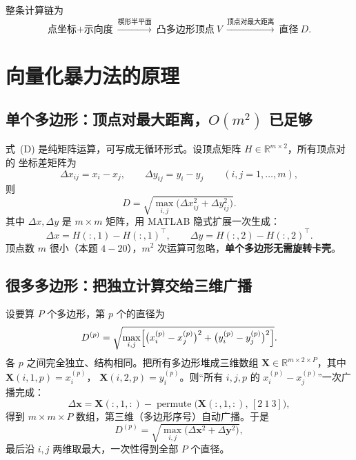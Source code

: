 \documentclass[11pt,a4paper]{ctexart}
\begin{document}
整条计算链为
\begin{equation}
\text{点坐标+示向度}\ \xrightarrow{\text{楔形半平面}}\ \text{凸多边形顶点}\ V\ \xrightarrow{\text{顶点对最大距离}}\ \text{直径}\ D .
\end{equation}

\section{向量化暴力法的原理}

\subsection{单个多边形：顶点对最大距离，$O(m^2)$ 已足够}

式~(D) 是纯矩阵运算，可写成无循环形式。设顶点矩阵 $H\in\mathbb R^{m\times2}$，所有顶点对的
坐标差矩阵为
\begin{equation}
\Delta x_{ij}=x_i-x_j,\qquad \Delta y_{ij}=y_i-y_j\qquad (i,j=1,\dots,m),
\end{equation}
则
\begin{equation}
D=\sqrt{\max_{i,j}\bigl(\Delta x_{ij}^2+\Delta y_{ij}^2\bigr)} .
\end{equation}
其中 $\Delta x,\Delta y$ 是 $m\times m$ 矩阵，用 MATLAB 隐式扩展一次生成：
\begin{equation}
\Delta x = H(:,1)-H(:,1)^{\top},\qquad \Delta y = H(:,2)-H(:,2)^{\top} .
\end{equation}
顶点数 $m$ 很小（本题 $4\!-\!20$），$m^2$ 次运算可忽略，\textbf{单个多边形无需旋转卡壳}。

\subsection{很多多边形：把独立计算交给三维广播}

设要算 $P$ 个多边形，第 $p$ 个的直径为
\begin{equation}
D^{(p)}=\sqrt{\max_{i,j}\Bigl[\bigl(x_i^{(p)}-x_j^{(p)}\bigr)^2+\bigl(y_i^{(p)}-y_j^{(p)}\bigr)^2\Bigr]}.
\end{equation}
各 $p$ 之间完全独立、结构相同。把所有多边形堆成三维数组
$\mathbf X\in\mathbb R^{m\times2\times P}$，其中 $\mathbf X(i,1,p)=x_i^{(p)}$，
$\mathbf X(i,2,p)=y_i^{(p)}$。则“所有 $i,j,p$ 的 $x_i^{(p)}-x_j^{(p)}$”一次广播完成：
\begin{equation}
\Delta\mathbf x=\mathbf X(:,1,:)-\operatorname{permute}\bigl(\mathbf X(:,1,:),\,[2\ 1\ 3]\bigr),
\end{equation}
得到 $m\times m\times P$ 数组，第三维（多边形序号）自动广播。于是
\begin{equation}
D^{(p)}=\sqrt{\max_{i,j}\bigl(\Delta\mathbf x^2+\Delta\mathbf y^2\bigr)},
\end{equation}
最后沿 $i,j$ 两维取最大，一次性得到全部 $P$ 个直径。
\end{document}
